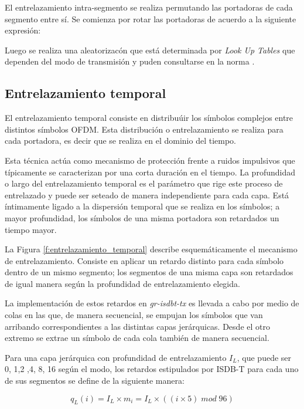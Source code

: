 El entrelazamiento intra-segmento se realiza permutando las portadoras de cada segmento entre s\'i. Se comienza por rotar las portadoras de acuerdo a la siguiente expresi\'on:

Luego se realiza una aleatorizac\'on que est\'a determinada por \textit{Look Up Tables} que dependen del modo de transmisi\'on y puden consultarse en la norma \cite{norma}.

\subsection{Entrelazamiento temporal}

El entrelazamiento temporal consiste en distribu\'uir los s\'imbolos complejos entre distintos s\'imbolos OFDM. Esta distribuci\'on o entrelazamiento se realiza para cada portadora, es decir que se realiza en el dominio del tiempo.

Esta t\'ecnica act\'ua como mecanismo de protecci\'on frente a ruidos impulsivos que t\'ipicamente se caracterizan por una corta duraci\'on en el tiempo. La profundidad o largo del entrelazamiento temporal es el par\'ametro que rige este proceso de entrelazado y puede ser seteado de manera independiente para cada capa. Est\'a \'intimamente ligado a la dispersi\'on temporal que se realiza en los s\'imbolos; a mayor profundidad, los s\'imbolos de una misma portadora son retardados un tiempo mayor.

La Figura \ref{f:entrelazamiento_temporal} describe esquem\'aticamente el mecanismo de entrelazamiento. Consiste en aplicar un retardo distinto para cada s\'imbolo dentro de un mismo segmento; los segmentos de una misma capa son retardados de igual manera seg\'un la profundidad de entrelazamiento elegida. 

La implementaci\'on de estos retardos en \textit{gr-isdbt-tx} es llevada a cabo por medio de colas en las que, de manera secuencial, se empujan los s\'imbolos que van arribando correspondientes a las distintas capas jer\'arquicas. Desde el otro extremo se extrae un s\'imbolo de cada cola tambi\'en de manera secuencial. 

Para una capa jer\'arquica con profundidad de entrelazamiento $I_L$, que puede ser 0, 1,2 ,4, 8, 16 seg\'un el modo, los retardos estipulados por ISDB-T para cada uno de sus segmentos se define de la siguiente manera:

\begin{equation}
q_L(i) = I_L \times m_i = I_L \times ((i \times 5) \; mod \; 96)
\end{equation}

